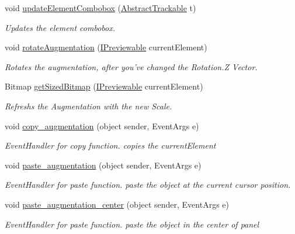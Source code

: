 \begin{DoxyCompactItemize}
void \hyperlink{class_preview_controller_ae33fd4d13286e22a819f5a6cd5de292f}{update\-Element\-Combobox} (\hyperlink{class_a_rdev_kit_1_1_model_1_1_project_1_1_abstract_trackable}{Abstract\-Trackable} t)
\begin{DoxyCompactList}\small\item\em Updates the element combobox. \end{DoxyCompactList}\item 
void \hyperlink{class_preview_controller_ae491c6460dec4eba08e93a12044edf8c}{rotate\-Augmentation} (\hyperlink{interface_a_rdev_kit_1_1_model_1_1_project_1_1_i_previewable}{I\-Previewable} current\-Element)
\begin{DoxyCompactList}\small\item\em Rotates the augmentation, after you've changed the Rotation.\-Z Vector. \end{DoxyCompactList}\item 
Bitmap \hyperlink{class_preview_controller_a22b51f7117d79a44defe07c627e52982}{get\-Sized\-Bitmap} (\hyperlink{interface_a_rdev_kit_1_1_model_1_1_project_1_1_i_previewable}{I\-Previewable} current\-Element)
\begin{DoxyCompactList}\small\item\em Refreshs the Augmentation with the new Scale. \end{DoxyCompactList}\item 
void \hyperlink{class_preview_controller_a3ee38c7b2e1a69fbe823b8092c2d6c86}{copy\-\_\-augmentation} (object sender, Event\-Args e)
\begin{DoxyCompactList}\small\item\em Event\-Handler for copy function. copies the current\-Element \end{DoxyCompactList}\item 
void \hyperlink{class_preview_controller_a58e44b6e2acc62906bfc29eb6854ce32}{paste\-\_\-augmentation} (object sender, Event\-Args e)
\begin{DoxyCompactList}\small\item\em Event\-Handler for paste function. paste the object at the current cursor position. \end{DoxyCompactList}\item 
void \hyperlink{class_preview_controller_a5cc0d886165ca91677acadd895426af2}{paste\-\_\-augmentation\-\_\-center} (object sender, Event\-Args e)
\begin{DoxyCompactList}\small\item\em Event\-Handler for paste function. paste the object in the center of panel \end{DoxyCompactList}\item 

\end{DoxyCompactItemize}

